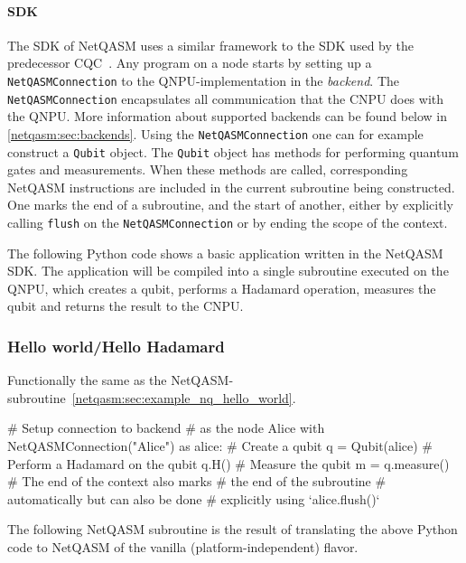 \paragraph{SDK}
The SDK of \ac{NetQASM} uses a similar framework to the SDK used by the predecessor \ac{CQC}~\cite{git_cqc}.
Any program on a node starts by setting up a \texttt{NetQASMConnection} to the \ac{QNPU}-implementation in the \emph{backend}.
The \texttt{NetQASMConnection} encapsulates all communication that the \ac{CNPU} does with the \ac{QNPU}.
More information about supported backends can be found below in \cref{netqasm:sec:backends}.
Using the \texttt{NetQASMConnection} one can for example construct a \texttt{Qubit} object.
The \texttt{Qubit} object has methods for performing quantum gates and measurements.
When these methods are called, corresponding \ac{NetQASM} instructions are included in the current subroutine being constructed.
One marks the end of a subroutine, and the start of another, either by explicitly calling \texttt{flush} on the \texttt{NetQASMConnection} or by ending the scope of the  context.

The following Python code shows a basic application written in the \ac{NetQASM} SDK.
The application will be compiled into a single subroutine executed on the \ac{QNPU}, which creates a qubit, performs a Hadamard operation, measures the qubit and returns the result to the \ac{CNPU}.
\subsubsection{Hello world/Hello Hadamard}
Functionally the same as the \ac{NetQASM}-subroutine~\ref{netqasm:sec:example_nq_hello_world}.
\begin{pycode}
  # Setup connection to backend
  # as the node Alice
  with NetQASMConnection("Alice") as alice:
    # Create a qubit
    q = Qubit(alice)
    # Perform a Hadamard on the qubit
    q.H()
    # Measure the qubit
    m = q.measure()
    # The end of the context also marks
    # the end of the subroutine
    # automatically but can also be done
    # explicitly using `alice.flush()`
\end{pycode}

The following \ac{NetQASM} subroutine is the result of translating the above Python code to \ac{NetQASM} of the vanilla (platform-independent) flavor.

